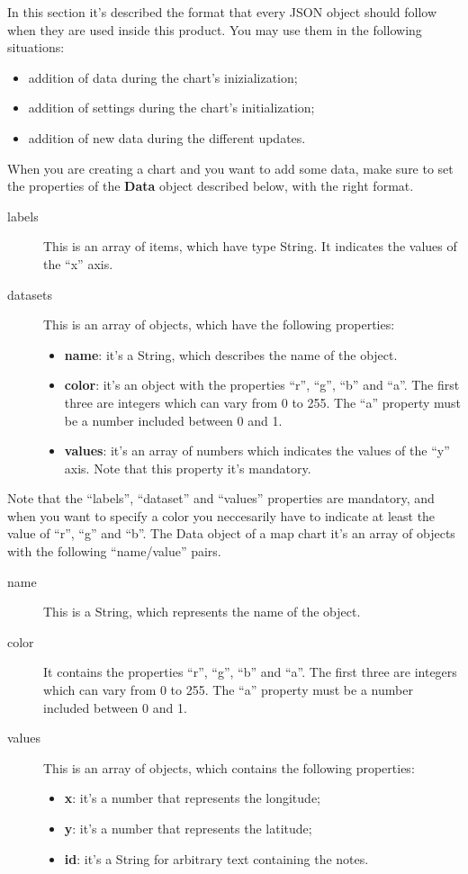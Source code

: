 	In this section it's described the format that every JSON object should follow when they are used inside this product. You may use them in the following situations:
	\begin{itemize}
		\item addition of data during the chart's inizialization;
		\item addition of settings during the chart's initialization;
		\item addition of new data during the different updates.
	\end{itemize}

	When you are creating a chart and you want to add some data, make sure to set the properties of the \textbf{Data} object described below, with the right format.
		 \label{sec:dataBarLine}
		\begin{description}
			\item[labels] This is an array of items, which have type String. It indicates the values of the “x” axis.
			\item[datasets] This is an array of objects, which have the following properties: 
				\begin{itemize}
					\item \textbf{name}: it's a String, which describes the name of the object. 
					\item \textbf{color}: it's an object with the properties “r”, “g”, “b” and “a”. The first three are integers which can vary from 0 to 255. The “a” property must be a number included between 0 and 1. 
					\item \textbf{values}: it's an array of numbers which indicates the values of the “y” axis.
					Note that this property it's mandatory.
				\end{itemize}
		\end{description}
		Note that the “labels”, “dataset” and “values” properties are mandatory, and when you want to specify a color you neccesarily have to indicate at least the value of “r”, “g” and “b”.
		The Data object of a map chart it's an array of objects with the following “name/value” pairs.
		\begin{description}
			\item[name] This is a String, which represents the name of the object.
			\item[color] It contains the properties “r”, “g”, “b” and “a”. The first three are integers which can vary from 0 to 255. The “a” property must be a number included between 0 and 1. 
			\item[values] This is an array of objects, which contains the following properties:
				\begin{itemize}
					\item \textbf{x}: it's a number that represents the longitude;
					\item \textbf{y}: it's a number that represents the latitude;
					\item \textbf{id}: it's a String for arbitrary text containing the notes.
				\end{itemize}
		\end{description}
